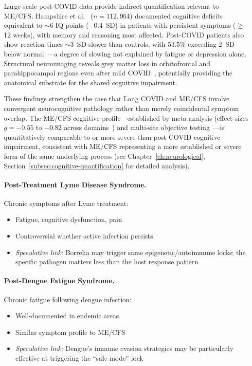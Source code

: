 Large-scale post-COVID data provide indirect quantification relevant to ME/CFS. Hampshire et al.~\cite{Hampshire2024cognition} ($n = 112{,}964$) documented cognitive deficits equivalent to $\sim$6 IQ points ($-0.4$~SD) in patients with persistent symptoms ($\geq$12 weeks), with memory and reasoning most affected. Post-COVID patients also show reaction times $\sim$3~SD slower than controls, with 53.5\% exceeding 2~SD below normal~\cite{Zhao2024cognitive}---a degree of slowing not explained by fatigue or depression alone. Structural neuroimaging reveals grey matter loss in orbitofrontal and parahippocampal regions even after mild COVID~\cite{Douaud2022brain}, potentially providing the anatomical substrate for the shared cognitive impairment.

These findings strengthen the case that Long COVID and ME/CFS involve convergent neurocognitive pathology rather than merely coincidental symptom overlap. The ME/CFS cognitive profile---established by meta-analysis (effect sizes $g = -0.55$ to $-0.82$ across domains~\cite{Sebaiti2022cognitive}) and multi-site objective testing~\cite{Lange2024cognitive}---is quantitatively comparable to or more severe than post-COVID cognitive impairment, consistent with ME/CFS representing a more established or severe form of the same underlying process (see Chapter~\ref{ch:neurological}, Section~\ref{subsec:cognitive-quantification} for detailed analysis).

\paragraph{Post-Treatment Lyme Disease Syndrome.} Chronic symptoms after Lyme treatment:
\begin{itemize}
    \item Fatigue, cognitive dysfunction, pain
    \item Controversial whether active infection persists
    \item \textit{Speculative link:} Borrelia may trigger same epigenetic/autoimmune locks; the specific pathogen matters less than the host response pattern
\end{itemize}

\paragraph{Post-Dengue Fatigue Syndrome.} Chronic fatigue following dengue infection:
\begin{itemize}
    \item Well-documented in endemic areas
    \item Similar symptom profile to ME/CFS
    \item \textit{Speculative link:} Dengue's immune evasion strategies may be particularly effective at triggering the ``safe mode'' lock
\end{itemize}

